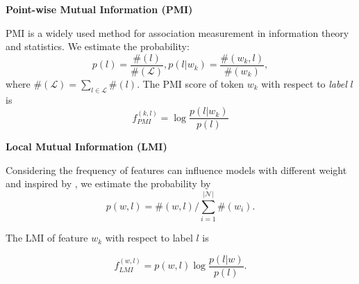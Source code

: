 \noindent\textbf{Point-wise Mutual Information (PMI)}

PMI is a widely used method for association measurement in information theory and statistics.
We estimate the probability:
\begin{equation}
p(l) = \frac{\#(l)}{\#(\mathcal{L})}, p(l|w_k) = \frac{\#(w_k, l)}{\#(w_k)},
\end{equation}
where $\#(\mathcal{L}) = \sum_{l\in \mathcal{L}} \#(l)$.
The PMI score of token $w_k$ with respect to \textit{label} $l$ is
\begin{equation}
    f_{PMI}^{(k,l)} = \log \frac{p(l|w_k)}{p(l)}
\end{equation}

\noindent\textbf{Local Mutual Information (LMI)}

Considering the frequency of features can influence models with different weight and inspired
by \citet{schuster2019towards}, we estimate the probability by
\begin{equation}
    p(w, l) = \#(w, l) / \sum_{i=1}^{|\mathcal{N}|}\#(w_i).
\end{equation}

The LMI of feature $w_k$ with respect to label $l$ is

\begin{equation}
    f_{LMI}^{(w,l)} = p(w, l)\log \frac{p(l|w)}{p(l)}.
\end{equation}


